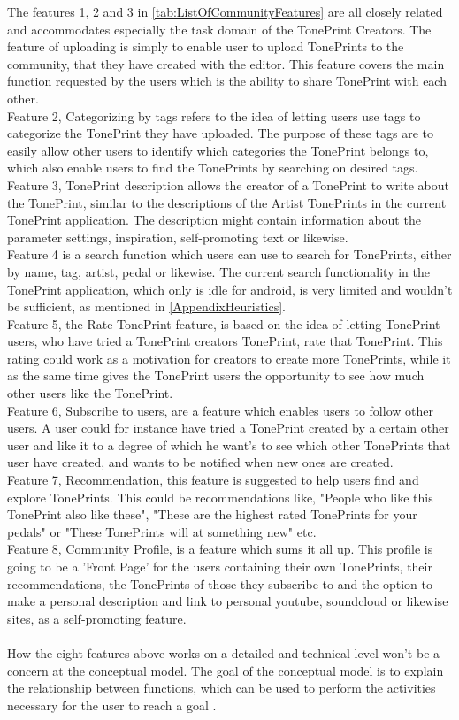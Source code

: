 The features 1, 2 and 3 in \autoref{tab:ListOfCommunityFeatures} are all closely related and accommodates especially the task domain of the TonePrint Creators. The feature of uploading is simply to enable user to upload TonePrints to the community, that they have created with the editor. This feature covers the main function requested by the users which is the ability to share TonePrint with each other. \\
Feature 2, Categorizing by tags refers to the idea of letting users use tags to categorize the TonePrint they have uploaded. The purpose of these tags are to easily allow other users to identify which categories the TonePrint belongs to, which also enable users to find the TonePrints by searching on desired tags.\\
Feature 3, TonePrint description allows the creator of a TonePrint to write about the TonePrint, similar to the descriptions of the Artist TonePrints in the current TonePrint application. The description might contain information about the parameter settings, inspiration, self-promoting text or likewise. \\
Feature 4 is a search function which users can use to search for TonePrints, either by name, tag, artist, pedal or likewise. The current search functionality in the TonePrint application, which only is idle for android, is very limited and wouldn't be sufficient, as mentioned in \autoref{AppendixHeuristics}. \\
Feature 5, the Rate TonePrint feature, is based on the idea of letting TonePrint users, who have tried a TonePrint creators TonePrint, rate that TonePrint. This rating could work as a motivation for creators to create more TonePrints, while it as the same time gives the TonePrint users the opportunity to see how much other users like the TonePrint. \\
Feature 6, Subscribe to users, are a feature which enables users to follow other users. A user could for instance have tried a TonePrint created by a certain other user and like it to a degree of which he want's to see which other TonePrints that user have created, and wants to be notified when new ones are created.\\
Feature 7, Recommendation, this feature is suggested to help users find and explore TonePrints. This could be recommendations like, "People who like this TonePrint also like these", "These are the highest rated TonePrints for your pedals" or "These TonePrints will at something new" etc.\\
Feature 8, Community Profile, is a feature which sums it all up. This profile is going to be a 'Front Page' for the users containing their own TonePrints, their recommendations, the TonePrints of those they subscribe to and the option to make a personal description and link to personal youtube, soundcloud or likewise sites, as a self-promoting feature.\\
\\
How the eight features above works on a detailed and technical level won't be a concern at the conceptual model. The goal of the conceptual model is to explain the relationship between functions, which can be used to perform the activities necessary for the user to reach a goal \parencite{Henderson2012}.


